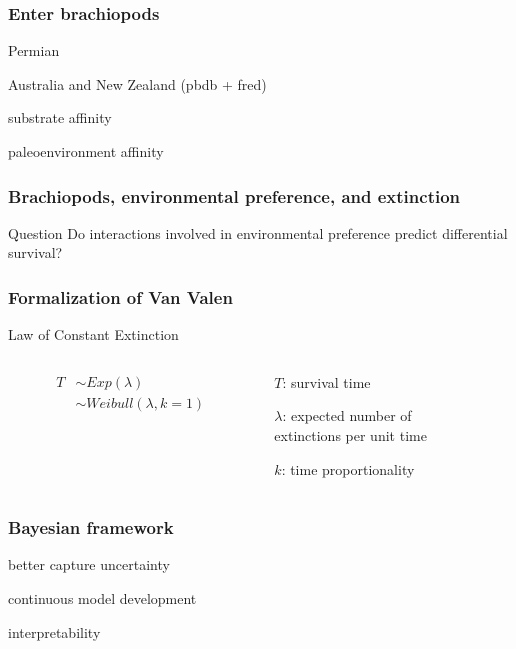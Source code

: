 \documentclass{beamer}
\begin{document}
\begin{frame}
  \frametitle{Enter brachiopods}

  Permian

  Australia and New Zealand (pbdb + fred)

  substrate affinity

  paleoenvironment affinity
\end{frame}


\begin{frame}
  \frametitle{Brachiopods, environmental preference, and extinction}

  \begin{alertblock}{Question}
    Do interactions involved in environmental preference predict differential survival?
  \end{alertblock}
\end{frame}

\begin{frame}
  \frametitle{Formalization of Van Valen}

  \begin{block}{Law of Constant Extinction}
    \begin{columns}
      \begin{column}{0.5\textwidth}
        \begin{align*}
          T &\sim Exp(\lambda)\ \\ 
          &\sim Weibull(\lambda, k = 1) 
        \end{align*}
      \end{column}
      \begin{column}{0.5\textwidth}

        \(T\): survival time
        
        \(\lambda\): expected number of \\extinctions per unit time
        
        \(k\): time proportionality
      \end{column}
    \end{columns}

  \end{block}
\end{frame}






\begin{frame}
  \frametitle{Bayesian framework}

  better capture uncertainty

  continuous model development

  interpretability 

\end{frame}
\end{document}
